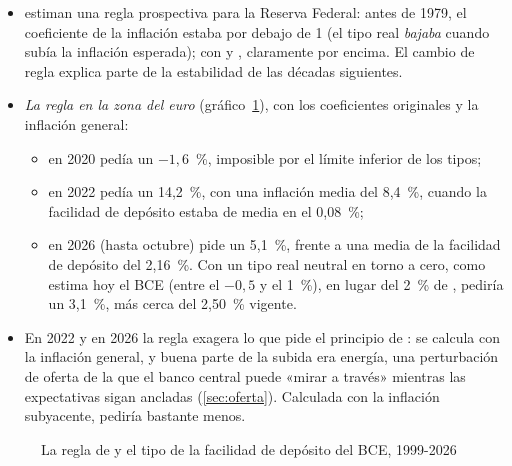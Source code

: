 \documentclass[11pt]{article}
\begin{document}
\begin{itemize}
\item \textcite{ClaridaGaliGertler2000Rules} estiman una regla prospectiva para la Reserva Federal: antes de 1979, el coeficiente de la inflación estaba por debajo de 1 (el tipo real \emph{bajaba} cuando subía la inflación esperada); con  y , claramente por encima. El cambio de regla explica parte de la estabilidad de las décadas siguientes.
\item \emph{La regla en la zona del euro} (gráfico~\ref{fig:regla-taylor-zona-euro}), con los coeficientes originales y la inflación general\nocite{BCE2026TiposOficiales,Eurostat2026IAPC,CE2026AMECOBrecha}:
  \begin{itemize}
  \item en 2020 pedía un $-1{,}6$~\%, imposible por el límite inferior de los tipos;
  \item en 2022 pedía un 14,2~\%, con una inflación media del 8,4~\%, cuando la facilidad de depósito estaba de media en el 0,08~\%;
  \item en 2026 (hasta octubre) pide un 5,1~\%, frente a una media de la facilidad de depósito del 2,16~\%. Con un tipo real neutral en torno a cero, como estima hoy el BCE (entre el $-0{,}5$ y el 1~\%\nocite{BrandLisackMazelis2025Natural}), en lugar del 2~\% de , pediría un 3,1~\%, más cerca del 2,50~\% vigente.
  \end{itemize}
\item En 2022 y en 2026 la regla exagera lo que pide el principio de : se calcula con la inflación general, y buena parte de la subida era energía, una perturbación de oferta de la que el banco central puede «mirar a través» mientras las expectativas sigan ancladas (\ref{sec:oferta}). Calculada con la inflación subyacente, pediría bastante menos.
\end{itemize}

\begin{figure}[H]
\centering
\caption{La regla de  y el tipo de la facilidad de depósito del BCE, 1999-2026}\label{fig:regla-taylor-zona-euro}
\end{figure}
\end{document}
